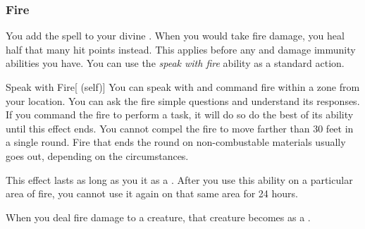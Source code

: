         \subsubsection{Fire}
             You add the  spell to your divine .
             When you would take fire damage, you heal half that many hit points instead.
            This applies before any  and damage immunity abilities you have.
             You can use the \textit{speak with fire} ability as a standard action.
            \begin{attuneability}{Speak with Fire}[ (self)]
                You can speak with and command fire within a \areahuge zone from your location.
                You can ask the fire simple questions and understand its responses.
                If you command the fire to perform a task, it will do so do the best of its ability until this effect ends.
                You cannot compel the fire to move farther than 30 feet in a single round.
                Fire that ends the round on non-combustable materials usually goes out, depending on the circumstances.

                This effect lasts as long as you  it as a .
                After you use this ability on a particular area of fire, you cannot use it again on that same area for 24 hours.
            \end{attuneability}
             When you deal fire damage to a creature, that creature becomes \ignited as a .

